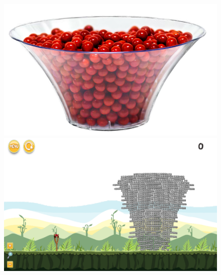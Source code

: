\documentclass{dalthesis}
\begin{document}
\begin{figure}
  \includegraphics[width=\textwidth,height=\textheight,keepaspectratio]{levels/pictures/halloween/candy_bowl.jpg}
  \includegraphics[width=\textwidth,height=\textheight,keepaspectratio]{levels/screenshots/halloween/candy_bowl.png}
\end{figure}
\end{document}
